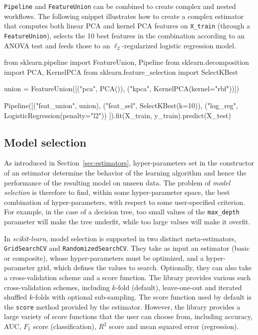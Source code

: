 \documentclass{llncs}
\newcommand{\sklearn}{\textit{scikit-learn}\xspace}
\begin{document}
\texttt{Pipeline} and \texttt{FeatureUnion} can be
combined to create complex and nested workflows.
The following snippet illustrates how to create a complex estimator
that computes both linear PCA and kernel PCA features on \texttt{X\_train}
(through a \texttt{FeatureUnion}),
selects the 10 best features in the combination according to an ANOVA test
and feeds those to an $\ell_2$-regularized logistic regression model.
\begin{pythoncode}
from sklearn.pipeline import FeatureUnion, Pipeline
from sklearn.decomposition import PCA, KernelPCA
from sklearn.feature_selection import SelectKBest

union = FeatureUnion([("pca", PCA()),
                      ("kpca", KernelPCA(kernel="rbf"))])

Pipeline([("feat_union", union),
          ("feat_sel", SelectKBest(k=10)),
          ("log_reg", LogisticRegression(penalty="l2"))
]).fit(X_train, y_train).predict(X_test)
\end{pythoncode}

\subsection{Model selection}

As introduced in Section~\ref{sec:estimators}, hyper-parameters set in the
constructor of an estimator
determine the behavior of the learning algorithm
and hence the performance of the resulting model on unseen data.
The problem of \textit{model selection} is therefore to find, within
some hyper-parameter space, the best combination of hyper-parameters, with
respect to some user-specified criterion. For example, in the case of a decision
tree, too small values of the \texttt{max\_depth} parameter will make the tree
underfit, while too large values will make it overfit.

In \sklearn, model selection is supported in two distinct meta-estimators,
\texttt{GridSearchCV} and \texttt{RandomizedSearchCV}.  They take as input an
estimator (basic or composite), whose hyper-parameters must be optimized, and a
hyper-parameter grid, which defines the values to search. Optionally, they can
also take a cross-validation scheme and a score function.  The library provides
various such cross-validation schemes, including $k$-fold (default),
leave-one-out and iterated shuffled $k$-folds with optional sub-sampling.
The score function used by default is the \texttt{score} method
provided by the estimator. However, the library provides a large variety of
score functions that the user can choose from,
including accuracy, AUC, $F_1$ score (classification),
$R^2$ score and mean squared error (regression).
\end{document}
